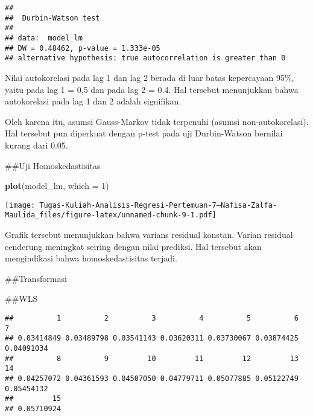 \documentclass[
]{article}
\newenvironment{Shaded}{\begin{snugshade}}{\end{snugshade}}
\newcommand{\AttributeTok}[1]{\textcolor[rgb]{0.13,0.29,0.53}{#1}}
\newcommand{\DecValTok}[1]{\textcolor[rgb]{0.00,0.00,0.81}{#1}}
\newcommand{\FunctionTok}[1]{\textcolor[rgb]{0.13,0.29,0.53}{\textbf{#1}}}
\newcommand{\NormalTok}[1]{#1}
\newcommand{\OtherTok}[1]{\textcolor[rgb]{0.56,0.35,0.01}{#1}}
\newcommand{\SpecialCharTok}[1]{\textcolor[rgb]{0.81,0.36,0.00}{\textbf{#1}}}
\begin{document}
\begin{verbatim}
## 
##  Durbin-Watson test
## 
## data:  model_lm
## DW = 0.48462, p-value = 1.333e-05
## alternative hypothesis: true autocorrelation is greater than 0
\end{verbatim}

Nilai autokorelasi pada lag 1 dan lag 2 berada di luar batas kepercayaan
95\%, yaitu pada lag 1 = 0,5 dan pada lag 2 = 0.4. Hal tersebut
menunjukkan bahwa autokorelasi pada lag 1 dan 2 adalah signifikan.

Oleh karena itu, asumsi Gauss-Markov tidak terpenuhi (asumsi
non-autokorelasi). Hal tersebut pun diperkuat dengan p-test pada uji
Durbin-Watson bernilai kurang dari 0.05.

\#\#Uji Homoskedastisitas

\begin{Shaded}
\begin{Highlighting}[]
\FunctionTok{plot}\NormalTok{(model\_lm, }\AttributeTok{which =} \DecValTok{1}\NormalTok{)}
\end{Highlighting}
\end{Shaded}

\texttt{[image: Tugas-Kuliah-Analisis-Regresi-Pertemuan-7---Nafisa-Zalfa-Maulida\_files/figure-latex/unnamed-chunk-9-1.pdf]}

Grafik tersebut menunjukkan bahwa varians residual konstan. Varian
residual cenderung meningkat seiring dengan nilai prediksi. Hal tersebut
akan mengindikasi bahwa homoskedastisitas terjadi.

\#\#Transformasi

\#\#WLS

\begin{Shaded}
\end{Shaded}

\begin{verbatim}
##          1          2          3          4          5          6          7 
## 0.03414849 0.03489798 0.03541143 0.03620311 0.03730067 0.03874425 0.04091034 
##          8          9         10         11         12         13         14 
## 0.04257072 0.04361593 0.04507050 0.04779711 0.05077885 0.05122749 0.05454132 
##         15 
## 0.05710924
\end{verbatim}
\end{document}
